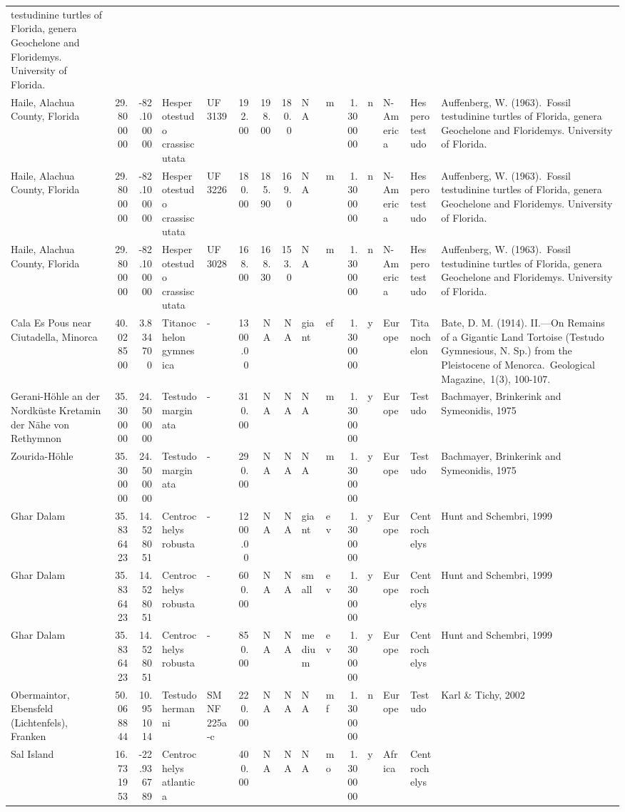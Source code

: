 \documentclass[]{article}
\begin{document}
\begin{longtable}[]{@{}lrrllrrrllrllll@{}}
testudinine turtles of Florida, genera Geochelone and Floridemys.
University of Florida.\tabularnewline
Haile, Alachua County, Florida & 29.800000 & -82.100000 & Hesperotestudo
crassiscutata & UF 3139 & 192.00 & 198.00 & 180.0 & NA & m & 1.300000 &
n & N-America & Hesperotestudo & Auffenberg, W. (1963).~Fossil
testudinine turtles of Florida, genera Geochelone and Floridemys.
University of Florida.\tabularnewline
Haile, Alachua County, Florida & 29.800000 & -82.100000 & Hesperotestudo
crassiscutata & UF 3226 & 180.00 & 185.90 & 169.0 & NA & m & 1.300000 &
n & N-America & Hesperotestudo & Auffenberg, W. (1963).~Fossil
testudinine turtles of Florida, genera Geochelone and Floridemys.
University of Florida.\tabularnewline
Haile, Alachua County, Florida & 29.800000 & -82.100000 & Hesperotestudo
crassiscutata & UF 3028 & 168.00 & 168.30 & 153.0 & NA & m & 1.300000 &
n & N-America & Hesperotestudo & Auffenberg, W. (1963).~Fossil
testudinine turtles of Florida, genera Geochelone and Floridemys.
University of Florida.\tabularnewline
Cala Es Pous near Ciutadella, Minorca & 40.028500 & 3.834700 &
Titanochelon gymnesica & - & 1300.00 & NA & NA & giant & ef & 1.300000 &
y & Europe & Titanochelon & Bate, D. M. (1914). II.---On Remains of a
Gigantic Land Tortoise (Testudo Gymnesious, N. Sp.) from the Pleistocene
of Menorca.~Geological Magazine,~1(3), 100-107.\tabularnewline
Gerani-Höhle an der Nordküste Kretamin der Nähe von Rethymnon &
35.300000 & 24.500000 & Testudo marginata & - & 310.00 & NA & NA & NA &
m & 1.300000 & y & Europe & Testudo & Bachmayer, Brinkerink and
Symeonidis, 1975\tabularnewline
Zourida-Höhle & 35.300000 & 24.500000 & Testudo marginata & - & 290.00 &
NA & NA & NA & m & 1.300000 & y & Europe & Testudo & Bachmayer,
Brinkerink and Symeonidis, 1975\tabularnewline
Ghar Dalam & 35.836423 & 14.528051 & Centrochelys robusta & - & 1200.00
& NA & NA & giant & ev & 1.300000 & y & Europe & Centrochelys & Hunt and
Schembri, 1999\tabularnewline
Ghar Dalam & 35.836423 & 14.528051 & Centrochelys robusta & - & 600.00 &
NA & NA & small & ev & 1.300000 & y & Europe & Centrochelys & Hunt and
Schembri, 1999\tabularnewline
Ghar Dalam & 35.836423 & 14.528051 & Centrochelys robusta & - & 850.00 &
NA & NA & medium & ev & 1.300000 & y & Europe & Centrochelys & Hunt and
Schembri, 1999\tabularnewline
Obermaintor, Ebensfeld (Lichtenfels), Franken & 50.068844 & 10.951014 &
Testudo hermanni & SMNF 225a-c & 220.00 & NA & NA & NA & mf & 1.300000 &
n & Europe & Testudo & Karl \& Tichy, 2002\tabularnewline
Sal Island & 16.731953 & -22.936789 & Centrochelys atlantica & & 400.00
& NA & NA & NA & mo & 1.300000 & y & Africa & Centrochelys &

\end{longtable}
\end{document}
